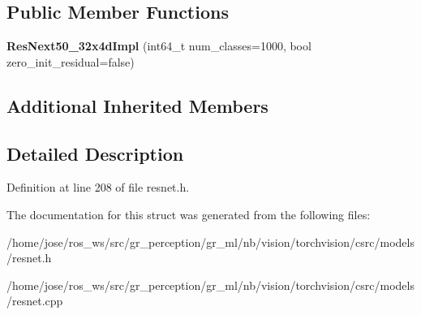 \subsection*{Public Member Functions}
\begin{DoxyCompactItemize}
\item 
\mbox{\label{structvision_1_1models_1_1ResNext50__32x4dImpl_a36bda5d78b9ed6f00d73b83402233ca4}} 
{\bfseries Res\+Next50\+\_\+32x4d\+Impl} (int64\+\_\+t num\+\_\+classes=1000, bool zero\+\_\+init\+\_\+residual=false)
\end{DoxyCompactItemize}
\subsection*{Additional Inherited Members}


\subsection{Detailed Description}


Definition at line 208 of file resnet.\+h.



The documentation for this struct was generated from the following files\+:\begin{DoxyCompactItemize}
\item 
/home/jose/ros\+\_\+ws/src/gr\+\_\+perception/gr\+\_\+ml/nb/vision/torchvision/csrc/models/resnet.\+h\item 
/home/jose/ros\+\_\+ws/src/gr\+\_\+perception/gr\+\_\+ml/nb/vision/torchvision/csrc/models/resnet.\+cpp\end{DoxyCompactItemize}
